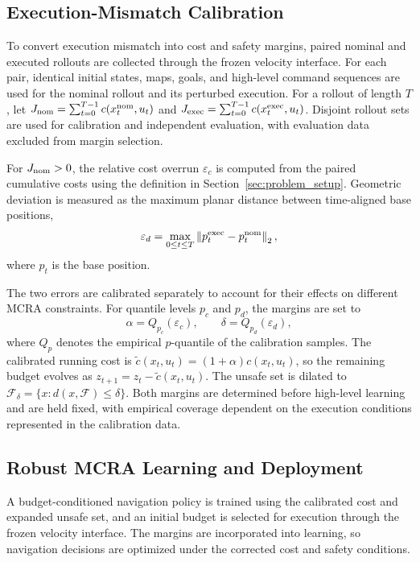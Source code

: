 \documentclass[conference]{IEEEtran}
\begin{document}
\subsection{Execution-Mismatch Calibration}
\label{sec:execution_calibration}
To convert execution mismatch into cost and safety margins, paired nominal and
executed rollouts are collected through the frozen velocity interface. For each
pair, identical initial states, maps, goals, and high-level command sequences are
used for the nominal rollout and its perturbed execution. For a rollout of length $T$, let
$J_{\rm nom}=\sum_{t=0}^{T-1}c(x_t^{\rm nom},u_t)$ and
$J_{\rm exec}=\sum_{t=0}^{T-1}c(x_t^{\rm exec},u_t)$. Disjoint rollout sets are
used for calibration and independent evaluation, with evaluation data excluded
from margin selection.

For $J_{\rm nom}>0$, the relative cost overrun $\varepsilon_c$ is computed from
the paired cumulative costs using the definition in Section~\ref{sec:problem_setup}.
Geometric deviation is measured as the maximum planar distance between
time-aligned base positions,
\begin{equation}
\varepsilon_d=\max_{0\leq t\leq T} \left\|p_t^{\rm exec}-p_t^{\rm nom}\right\|_2,
\label{eq:max_planar_deviation}
\end{equation}
where $p_t$ is the base position.

The two errors are calibrated separately to account for their effects on different
MCRA constraints. For quantile levels $p_c$ and $p_d$, the margins are set to
\begin{equation}
\alpha=Q_{p_c}(\varepsilon_c),\qquad
\delta=Q_{p_d}(\varepsilon_d),
\label{eq:calibration_margins}
\end{equation}
where $Q_p$ denotes the empirical $p$-quantile of the calibration samples. The
calibrated running cost is
$\tilde c(x_t,u_t)=(1+\alpha)c(x_t,u_t)$, so the remaining budget evolves as
$z_{t+1}=z_t-\tilde c(x_t,u_t)$. The unsafe set is dilated to
$\mathcal{F}_\delta=\{x:d(x,\mathcal{F})\leq\delta\}$. Both margins are determined
before high-level learning and are held fixed, with empirical coverage dependent on the
execution conditions represented in the calibration data.

\subsection{Robust MCRA Learning and Deployment}
A budget-conditioned navigation policy is trained using the calibrated cost and
expanded unsafe set, and an initial budget is selected for execution through the
frozen velocity interface. The margins are incorporated into learning, so navigation
decisions are optimized under the corrected cost and safety conditions.
\end{document}
